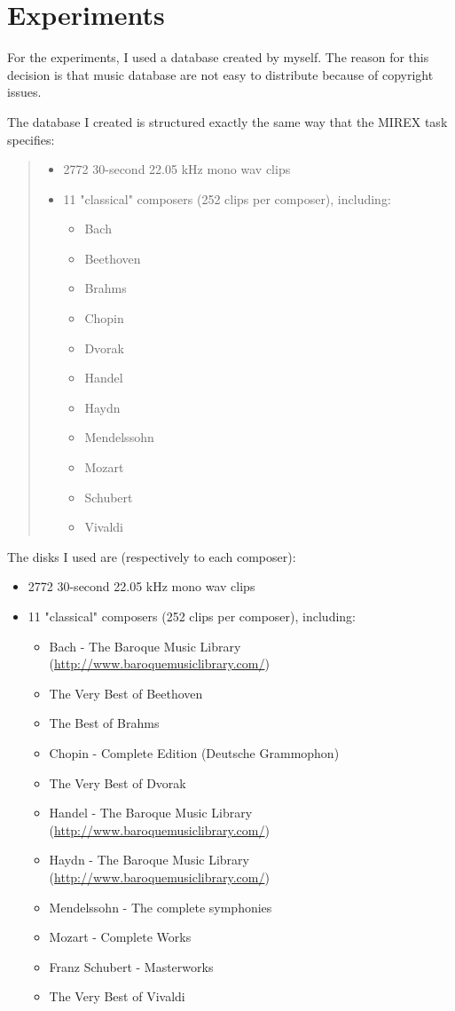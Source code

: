 \documentclass[a4paper,openany,oneside,12pt]{book}
\begin{document}
\chapter{Experiments}\label{experiments}
For the experiments, I used a database created by myself. The reason for this decision is that music database are not easy to distribute because of copyright issues.

The database I created is structured exactly the same way that the MIREX task specifies:

\begin{quote}
\begin{itemize}
\item 2772 30-second 22.05 kHz mono wav clips
\item 11 "classical" composers (252 clips per composer), including:
	\begin{itemize}
	\item Bach
	\item Beethoven
	\item Brahms
	\item Chopin
	\item Dvorak
	\item Handel
	\item Haydn
	\item Mendelssohn
	\item Mozart
	\item Schubert
	\item Vivaldi 
	\end{itemize}
\end{itemize}
\end{quote}

The disks I used are (respectively to each composer):
\begin{itemize}
\item 2772 30-second 22.05 kHz mono wav clips
\item 11 "classical" composers (252 clips per composer), including:
	\begin{itemize}
	\item Bach - The Baroque Music Library (\url{http://www.baroquemusiclibrary.com/})
	\item The Very Best of Beethoven
	\item The Best of Brahms
	\item Chopin - Complete Edition (Deutsche Grammophon)
	\item The Very Best of Dvorak
	\item Handel - The Baroque Music Library (\url{http://www.baroquemusiclibrary.com/})
	\item Haydn - The Baroque Music Library (\url{http://www.baroquemusiclibrary.com/})
	\item Mendelssohn - The complete symphonies
	\item Mozart - Complete Works 
	\item Franz Schubert - Masterworks
	\item The Very Best of Vivaldi 
	\end{itemize}
\end{itemize}
\end{document}
